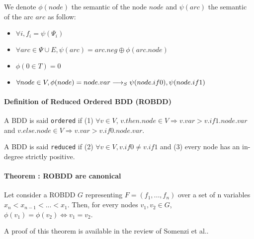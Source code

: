 \documentclass[a4paper,10pt]{article}
\begin{document}

We denote $\phi(node)$ the semantic of the node $node$ and $\psi(arc)$ the semantic of the arc $arc$ as follow:\begin{itemize}
\item $\forall i, f_i = \psi(\Psi_i)$
\item $\forall arc \in \Psi \cup E, \psi(arc) = arc.neg \oplus \phi(arc.node)$
\item $\phi(0 \in T) = 0$
\item $\forall node \in V, \phi(node) = node.var \longrightarrow_S \psi(node.if0), \psi(node.if1)$
\end{itemize}

\paragraph{Definition of Reduced Ordered BDD (ROBDD)\\}
A BDD is said \texttt{ordered} if (1) $\forall v\in V$, $v.then.node \in V \Rightarrow v.var > v.if1.node.var$ and $v.else.node \in V \Rightarrow v.var > v.if0.node.var$.

A BDD is said \texttt{reduced} if (2) $\forall v\in V, v.if0 \neq v.if1$ and (3) every node has an in-degree strictly positive.

\paragraph{Theorem : ROBDD are canonical\\}

Let consider a ROBDD $G$ representing $F=(f_1, ..., f_n)$ over a set of n variables $x_n < x_{n-1} < ... < x_1$. Then, for every nodes $v_1, v_2 \in G$, $\phi(v_1) = \phi(v_2) \Leftrightarrow v_1 = v_2$.

A proof of this theorem is available in the review of Somenzi et al.\cite{Somenzi1999}.
\end{document}
